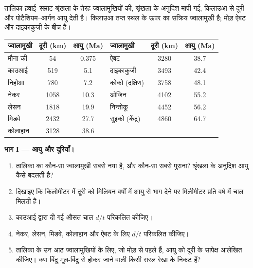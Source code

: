 \begin{problem}[{सप्ताहांत समस्या --- ज्वालामुखियों में लिखी एक प्लेट की चाल}]
\label{pb:g11:plate-motions:1}
तालिका हवाई--सम्राट श्रृंखला के तेरह ज्वालामुखियों की, श्रृंखला के अनुदिश मापी गई, किलाउआ से दूरी और
पोटैशियम--आर्गन आयु देती है।
किलाउआ तप्त स्थल के ऊपर का सक्रिय ज्वालामुखी है; मोड़ ऐबट
और दाइकाकुजी के बीच है।

\begin{center}
\small
\begin{tabular}{|l|c|c||l|c|c|}
\hline
ज्वालामुखी & दूरी (\unit{km}) & आयु (\unit{Ma}) & ज्वालामुखी & दूरी (\unit{km}) & आयु (\unit{Ma}) \\ \hline
मौना की & 54 & 0.375 & ऐबट & 3280 & 38.7 \\ \hline
काउआई & 519 & 5.1 & दाइकाकुजी & 3493 & 42.4 \\ \hline
निहोआ & 780 & 7.2 & कोको (दक्षिण) & 3758 & 48.1 \\ \hline
नेकर & 1058 & 10.3 & ओजिन & 4102 & 55.2 \\ \hline
लेसन & 1818 & 19.9 & निन्तोकू & 4452 & 56.2 \\ \hline
मिडवे & 2432 & 27.7 & सुइको (केंद्र) & 4860 & 64.7 \\ \hline
कोलाहान & 3128 & 38.6 & & & \\ \hline
\end{tabular}
\end{center}

\medskip
\noindent\textbf{भाग I --- आयु और दूरियाँ।}
\begin{enumerate}
  \item तालिका का कौन-सा ज्वालामुखी सबसे नया है, और कौन-सा सबसे पुराना? श्रृंखला के अनुदिश
        आयु कैसे बदलती है?
  \item दिखाइए कि किलोमीटर में दूरी को मिलियन वर्षों में आयु से भाग देने पर
        मिलीमीटर प्रति वर्ष में चाल मिलती है।
  \item काउआई द्वारा दी गई औसत चाल $d/t$ परिकलित कीजिए।
  \item नेकर, लेसन, मिडवे, कोलाहान और ऐबट के लिए $d/t$ परिकलित कीजिए।
  \item तालिका के उन आठ ज्वालामुखियों के लिए, जो मोड़ से पहले हैं, आयु को दूरी के सापेक्ष
        आलेखित कीजिए। क्या बिंदु मूल-बिंदु से होकर जाने वाली किसी सरल रेखा के
        निकट हैं?
\end{enumerate}


\end{problem}
